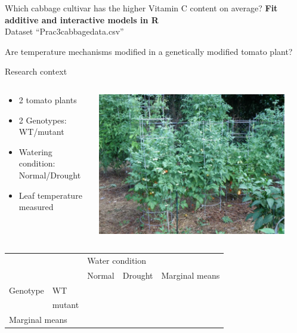\documentclass[10pt]{beamer}
\begin{document}

\begin{frame}{Which cabbage cultivar has the higher Vitamin C content on average?}
 \textbf{Fit additive and interactive models in R}\\
 Dataset ``Prac3cabbagedata.csv''
\end{frame}


\begin{frame}{Are temperature mechanisms modified in a genetically modified tomato plant?}
 \begin{block}{Research context}
 \begin{columns}
  \begin{column}{0.8\textwidth}
   \begin{itemize}
    \item 2 tomato plants
    \item 2 Genotypes: WT/mutant 
    \item Watering condition: Normal/Drought
    \item Leaf temperature measured
   \end{itemize}
  \end{column}
  \begin{column}{0.2\textwidth}
    \includegraphics[width=0.9\textwidth]{Figures/tomato}
  \end{column}

 \end{columns}
 \end{block}

   \pause
 
 \begin{center}
\begin{tabular}{|l | l | l | l | l |}
\toprule
  \multicolumn{2}{|l|}{} & \multicolumn{2}{l|}{Water condition} &\\
  \cmidrule(lr){3-5}
  \multicolumn{2}{|l|}{}  & Normal & Drought & Marginal means\\
 	    \midrule
      Genotype & WT &  & &\\
      \cmidrule(lr){2-5}
		& mutant &  & &\\
		\midrule
\multicolumn{2}{|l|}{Marginal means} &  & &\\	
	    \bottomrule
  \end{tabular}
\end{center}
 

\end{frame}
\end{document}
